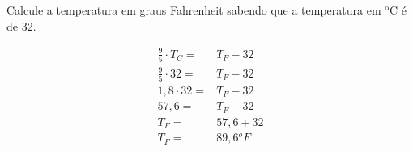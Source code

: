 \begin{example}
Calcule a temperatura em graus Fahrenheit sabendo que a temperatura em ${}^\text{o}$C é de 32.

\begin{ceqn}
\begin{align*}
\frac{9}{5} \cdot T_C =& T_F - 32 \\
\frac{9}{5} \cdot 32 =& T_F - 32 \\
1,8 \cdot 32 =& T_F - 32 \\
57,6 =& T_F -32 \\
T_F =& 57,6 + 32 \\
T_F =& 89,6 {}^oF \\
\end{align*}
\end{ceqn}
\end{example}
